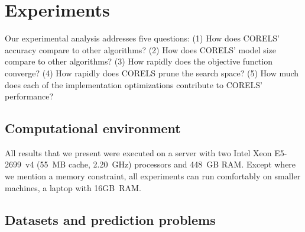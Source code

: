 \section{Experiments}
\label{sec:experiments}

Our experimental analysis addresses five questions:
(1) How does CORELS' accuracy compare to other algorithms?
(2) How does CORELS' model size compare to other algorithms?
(3) How rapidly does the objective function converge?
(4) How rapidly does CORELS prune the search space?
(5) How much does each of the implementation optimizations contribute to CORELS' performance?

\subsection{Computational environment}

All results that we present were executed on a server with two Intel Xeon E5-2699~v4
(55~MB cache, 2.20~GHz) processors and 448~GB RAM.
%
Except where we mention a memory constraint, all experiments
can run comfortably on smaller machines, \eg a laptop with 16GB~RAM.

\subsection{Datasets and prediction problems}

